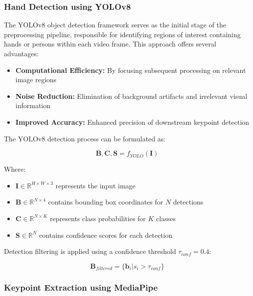 \documentclass[11pt, a4paper]{article}
\begin{document}
\subsubsection{Hand Detection using YOLOv8}

The YOLOv8 object detection framework serves as the initial stage of the preprocessing pipeline, responsible for identifying regions of interest containing hands or persons within each video frame. This approach offers several advantages:

\begin{itemize}
    \item \textbf{Computational Efficiency:} By focusing subsequent processing on relevant image regions
    \item \textbf{Noise Reduction:} Elimination of background artifacts and irrelevant visual information
    \item \textbf{Improved Accuracy:} Enhanced precision of downstream keypoint detection
\end{itemize}

The YOLOv8 detection process can be formulated as:

\begin{equation}
\mathbf{B}, \mathbf{C}, \mathbf{S} = f_{YOLO}(\mathbf{I})
\end{equation}

Where:
\begin{itemize}
    \item $\mathbf{I} \in \mathbb{R}^{H \times W \times 3}$ represents the input image
    \item $\mathbf{B} \in \mathbb{R}^{N \times 4}$ contains bounding box coordinates for $N$ detections
    \item $\mathbf{C} \in \mathbb{R}^{N \times K}$ represents class probabilities for $K$ classes
    \item $\mathbf{S} \in \mathbb{R}^{N}$ contains confidence scores for each detection
\end{itemize}

Detection filtering is applied using a confidence threshold $\tau_{conf} = 0.4$:

\begin{equation}
\mathbf{B}_{filtered} = \{\mathbf{b}_i | s_i > \tau_{conf}\}
\end{equation}

\subsubsection{Keypoint Extraction using MediaPipe}
\end{document}
